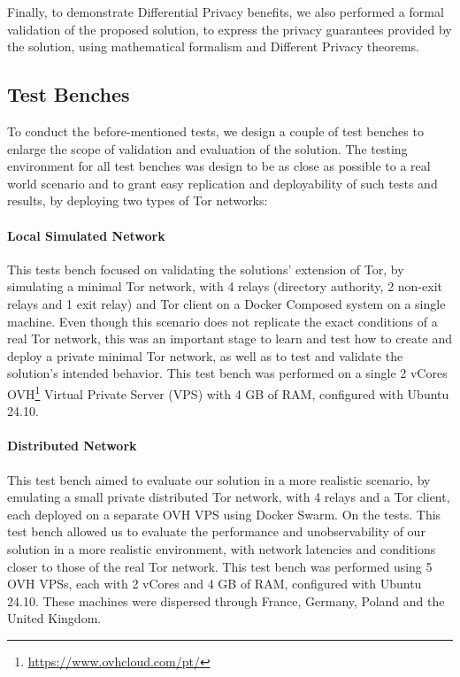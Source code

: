 Finally, to demonstrate Differential Privacy benefits, we also performed a formal validation of the proposed solution, to express the privacy guarantees provided by the solution, using mathematical formalism and Different Privacy theorems.

\subsection{Test Benches}\label{sec:testbenches}

To conduct the before-mentioned tests, we design a couple of test benches to enlarge the scope of validation and evaluation of the solution. The testing environment for all test benches was design to be as close as possible to a real world scenario and to grant easy replication and deployability of such tests and results, by deploying two types of Tor networks:
\paragraph{Local Simulated Network} This tests bench focused on validating the solutions' extension of Tor, by simulating a minimal Tor network, with 4 relays (directory authority, 2 non-exit relays and 1 exit relay) and Tor client on a Docker Composed system on a single machine. Even though this scenario does not replicate the exact conditions of a real Tor network, this was an important stage to learn and test how to create and deploy a private minimal Tor network, as well as to test and validate the solution's intended behavior. This test bench was performed on a single 2 vCores OVH\footnote{\url{https://www.ovhcloud.com/pt/}} Virtual Private Server (VPS) with 4 GB of RAM, configured with Ubuntu 24.10.
\paragraph{Distributed Network} This test bench aimed to evaluate our solution in a more realistic scenario, by emulating a small private distributed Tor network, with 4 relays and a Tor client, each deployed on a separate OVH VPS using Docker Swarm. On the tests. This test bench allowed us to evaluate the performance and unobservability of our solution in a more realistic environment, with network latencies and conditions closer to those of the real Tor network. This test bench was performed using 5 OVH VPSs, each with 2 vCores and 4 GB of RAM, configured with Ubuntu 24.10. These machines were dispersed through France, Germany, Poland and the United Kingdom.

